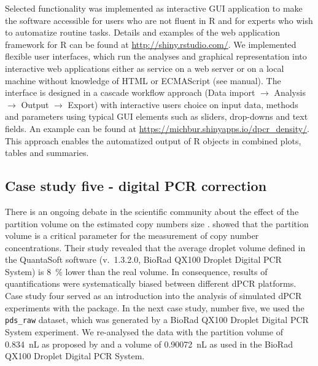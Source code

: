 Selected functionality was implemented as interactive  GUI 
application to make the software accessible for users who are not fluent in R 
and for experts who wish to automatize routine tasks. Details and examples of 
the  web application framework for R can be found at 
\url{http://shiny.rstudio.com/}. We implemented flexible user interfaces, which 
run the analyses and graphical representation into interactive web applications 
either as service on a web server or on a local machine without knowledge of 
HTML or ECMAScript (see  manual). The interface is designed in a 
cascade workflow approach (Data import $\rightarrow$ Analysis $\rightarrow$ 
Output $\rightarrow$ Export) with interactive users choice on input data, 
methods and parameters using typical GUI elements such as sliders, drop-downs 
and text fields. An example can be found at 
\url{https://michbur.shinyapps.io/dpcr_density/}. This approach enables the 
automatized output of R objects in combined plots, tables and summaries.

\subsection{Case study five - digital PCR correction}

There is an ongoing debate in the scientific community about the effect of the 
partition volume on the estimated copy numbers size 
\citep{huggett_clinchem_2014, corbisier_2015, majumdar_2015}. 
\citet{corbisier_2015} showed that the partition volume is a critical parameter 
for the measurement of copy number concentrations. Their study revealed that the 
average droplet volume defined in the QuantaSoft software (v.~1.3.2.0, BioRad 
QX100 Droplet Digital PCR System) is 8~\% lower than the real volume. In 
consequence, results of quantifications were systematically biased between 
different dPCR platforms. Case study four served as an introduction into the analysis of simulated dPCR 
experiments with the  package. In the next case study, number 
five, we used the \texttt{pds\_raw} dataset, which was generated by a BioRad 
QX100 Droplet Digital PCR System experiment. We re-analysed the data with the 
partition volume of 0.834~nL as proposed by \citet{corbisier_2015} and a volume 
of 0.90072~nL as used in the BioRad QX100 Droplet Digital PCR System.

